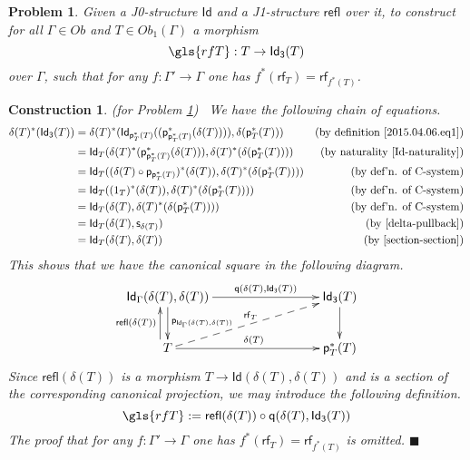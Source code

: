 \documentclass[12pt]{article}
\numberwithin{equation}{section}
\newenvironment{eq}{\begin{equation}}{\end{equation}}
\newtheorem{problem}[proposition]{Problem}
\newtheorem{construction0}[proposition]{Construction}
\newenvironment{construction}[1]{\begin{construction0}(for Problem \ref{#1})\ }{$\blacksquare$ \end{construction0}}
\newcommand{\by}[1]{\text{(by #1)}}
\newcommand{\sr}{\rightarrow}
\newcommand{\p}{\mathsf{p}}
\newcommand{\q}{\mathsf{q}}
\newcommand{\s}{\mathsf{s}}     %
\newcommand{\Id}{\mathsf{Id}} %
\newcommand{\Idx}{\mathsf{Id_3}} %
\newcommand{\refl}{\mathsf{refl}}
\newcommand{\rf}{\mathsf{rf}}
\begin{document}
\begin{problem}
\label{2015.03.27.prob2} Given a J0-structure $\Id$ and a J1-structure $\refl$
over it, to construct for all $\Gamma\in Ob$ and $T\in Ob_1(\Gamma)$ a morphism
%
$$\gls{rfT} : T \sr \Idx(T)$$
%
over $\Gamma$,
such that for any $f:\Gamma'\sr \Gamma$ one has $f^*(\rf_T)=\rf_{f^*(T)}$.
\end{problem}
%
\begin{construction}{2015.03.27.prob2}
\label{2015.03.27.constr2}\rm We have the following chain of equations.
%
\begin{align*}
  \delta(T)^*(\Idx(T)) & = \delta(T)^*(\Id_{\p_T^*(T)}((\p_{\p_T^*(T)}^*(\delta(T)))),\delta(\p_T^*(T)))
  & \by{definition \ref{2015.04.06.eq1}} \\
  & = \Id_T(\delta(T)^*(\p_{\p_T^*(T)}^*(\delta(T))),\delta(T)^*(\delta(\p_T^*(T))))
  & \by{naturality \ref{Id-naturality}} \\
  & = \Id_T((\delta(T) \circ \p_{\p_T^*(T)})^*(\delta(T)),\delta(T)^*(\delta(\p_T^*(T))))
  & \by{def'n{.} of C-system} \\
  & = \Id_T((1_T)^*(\delta(T)),\delta(T)^*(\delta(\p_T^*(T)))) 
  & \by{def'n{.} of C-system} \\
  & = \Id_T(\delta(T),\delta(T)^*(\delta(\p_T^*(T)))) 
  & \by{def'n{.} of C-system} \\
  & = \Id_T(\delta(T),\s_{\delta(T)})
  & \by{\ref{delta-pullback}}  \\
  & = \Id_T(\delta(T),\delta(T))
  & \by{\ref{section-section}} 
\end{align*}
%
This shows that we have the canonical square in the following diagram.
%
\begin{eq}
\label{2015.03.31.eq3}
\begin{xy}
          \xymatrix@C=7pc{ \Id_\Gamma(\delta(T),\delta(T))
            \ar[r]^-{\q(\delta(T),\Idx(T))} \ar[d]^{\p_{\Id_\Gamma(\delta(T),\delta(T))}} & \Idx(T) \ar[d]\\ T
            \ar[r]^{\delta(T)} \ar@<6pt>[u]^{\refl(\delta(T))} \ar@{-->}[ru]^{\rf_T}
            & \p_T^*(T) }
       \end{xy}
\end{eq}%
%
Since $\refl(\delta(T))$ is a morphism $T\sr \Id(\delta(T),\delta(T))$
and is a section of the corresponding canonical projection,
we may introduce the following definition.
%
\begin{eq}
\label{2015.04.02.eq1} \gls{rfT} :=\refl(\delta(T))\circ \q(\delta(T),\Idx(T))
\end{eq}%
%
The proof that for any $f:\Gamma'\sr \Gamma$ one has $f^*(\rf_T)=\rf_{f^*(T)}$ is
omitted.
\end{construction}
\end{document}
